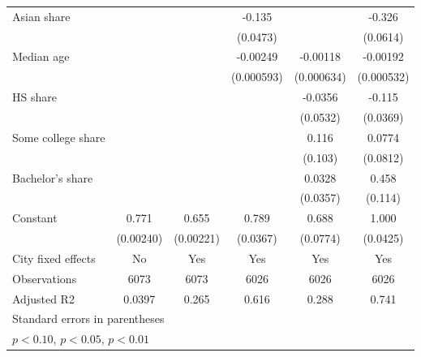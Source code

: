 {\begin{tabular}{l*{5}{c}}
\addlinespace
Asian share         &                     &                     &      -0.135\sym{***}&                     &      -0.326\sym{***}\\
                    &                     &                     &    (0.0473)         &                     &    (0.0614)         \\
\addlinespace
Median age          &                     &                     &    -0.00249\sym{***}&    -0.00118\sym{*}  &    -0.00192\sym{***}\\
                    &                     &                     &  (0.000593)         &  (0.000634)         &  (0.000532)         \\
\addlinespace
HS share            &                     &                     &                     &     -0.0356         &      -0.115\sym{***}\\
                    &                     &                     &                     &    (0.0532)         &    (0.0369)         \\
\addlinespace
Some college share  &                     &                     &                     &       0.116         &      0.0774         \\
                    &                     &                     &                     &     (0.103)         &    (0.0812)         \\
\addlinespace
Bachelor's share    &                     &                     &                     &      0.0328         &       0.458\sym{***}\\
                    &                     &                     &                     &    (0.0357)         &     (0.114)         \\
\addlinespace
Constant            &       0.771\sym{***}&       0.655\sym{***}&       0.789\sym{***}&       0.688\sym{***}&       1.000\sym{***}\\
                    &   (0.00240)         &   (0.00221)         &    (0.0367)         &    (0.0774)         &    (0.0425)         \\
\midrule
City fixed effects  &          No         &         Yes         &         Yes         &         Yes         &         Yes         \\
Observations        &        6073         &        6073         &        6026         &        6026         &        6026         \\
Adjusted R2         &      0.0397         &       0.265         &       0.616         &       0.288         &       0.741         \\
\bottomrule
\multicolumn{6}{l}{\footnotesize Standard errors in parentheses}\\
\multicolumn{6}{l}{\footnotesize \sym{*} \(p<0.10\), \sym{**} \(p<0.05\), \sym{***} \(p<0.01\)}\\
\end{tabular}
}
